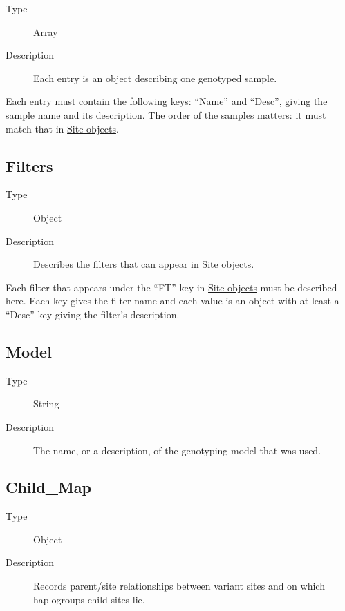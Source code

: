 \begin{description}
\item[Type]
Array
\item[Description]
Each entry is an object describing one genotyped sample.
\end{description}

Each entry must contain the following keys: ``Name'' and ``Desc'',
giving the sample name and its description. The order of the samples
matters: it must match that in \protect\hyperlink{site_obj}{Site
objects}.

\hypertarget{filters}{%
\subsection{Filters}\label{filters}}

\begin{description}
\item[Type]
Object
\item[Description]
Describes the filters that can appear in Site objects.
\end{description}

Each filter that appears under the ``FT'' key in
\protect\hyperlink{site_obj}{Site objects} must be described here. Each
key gives the filter name and each value is an object with at least a
``Desc'' key giving the filter's description.

\hypertarget{model}{%
\subsection{Model}\label{model}}

\begin{description}
\item[Type]
String
\item[Description]
The name, or a description, of the genotyping model that was used.
\end{description}

\hypertarget{child_map}{%
\subsection{Child\_Map}\label{child_map}}

\begin{description}
\item[Type]
Object
\item[Description]
Records parent/site relationships between variant sites and on which
haplogroups child sites lie.
\end{description}

